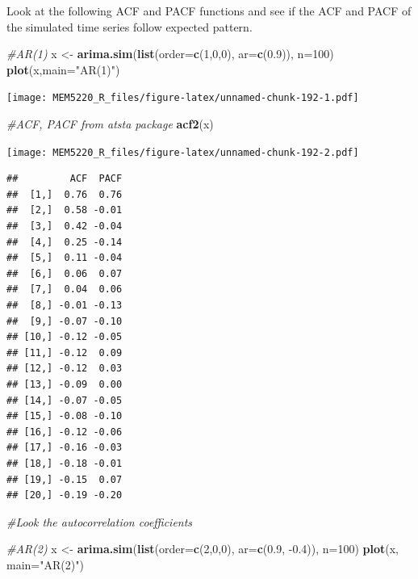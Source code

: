 \documentclass[]{book}
\newenvironment{Shaded}{\begin{snugshade}}{\end{snugshade}}
\newcommand{\CommentTok}[1]{\textcolor[rgb]{0.56,0.35,0.01}{\textit{#1}}}
\newcommand{\DataTypeTok}[1]{\textcolor[rgb]{0.13,0.29,0.53}{#1}}
\newcommand{\DecValTok}[1]{\textcolor[rgb]{0.00,0.00,0.81}{#1}}
\newcommand{\FloatTok}[1]{\textcolor[rgb]{0.00,0.00,0.81}{#1}}
\newcommand{\KeywordTok}[1]{\textcolor[rgb]{0.13,0.29,0.53}{\textbf{#1}}}
\newcommand{\NormalTok}[1]{#1}
\newcommand{\StringTok}[1]{\textcolor[rgb]{0.31,0.60,0.02}{#1}}
\begin{document}
Look at the following ACF and PACF functions and see if the ACF and PACF of the simulated time series follow expected pattern.

\begin{Shaded}
\begin{Highlighting}[]
\CommentTok{#AR(1)}
\NormalTok{x <-}\StringTok{ }\KeywordTok{arima.sim}\NormalTok{(}\KeywordTok{list}\NormalTok{(}\DataTypeTok{order=}\KeywordTok{c}\NormalTok{(}\DecValTok{1}\NormalTok{,}\DecValTok{0}\NormalTok{,}\DecValTok{0}\NormalTok{), }\DataTypeTok{ar=}\KeywordTok{c}\NormalTok{(}\FloatTok{0.9}\NormalTok{)), }\DataTypeTok{n=}\DecValTok{100}\NormalTok{)}
\KeywordTok{plot}\NormalTok{(x,}\DataTypeTok{main=}\StringTok{"AR(1)"}\NormalTok{) }
\end{Highlighting}
\end{Shaded}

\texttt{[image: MEM5220\_R\_files/figure-latex/unnamed-chunk-192-1.pdf]}

\begin{Shaded}
\begin{Highlighting}[]
\CommentTok{#ACF, PACF from atsta package}
\KeywordTok{acf2}\NormalTok{(x)}
\end{Highlighting}
\end{Shaded}

\texttt{[image: MEM5220\_R\_files/figure-latex/unnamed-chunk-192-2.pdf]}

\begin{verbatim}
##         ACF  PACF
##  [1,]  0.76  0.76
##  [2,]  0.58 -0.01
##  [3,]  0.42 -0.04
##  [4,]  0.25 -0.14
##  [5,]  0.11 -0.04
##  [6,]  0.06  0.07
##  [7,]  0.04  0.06
##  [8,] -0.01 -0.13
##  [9,] -0.07 -0.10
## [10,] -0.12 -0.05
## [11,] -0.12  0.09
## [12,] -0.12  0.03
## [13,] -0.09  0.00
## [14,] -0.07 -0.05
## [15,] -0.08 -0.10
## [16,] -0.12 -0.06
## [17,] -0.16 -0.03
## [18,] -0.18 -0.01
## [19,] -0.15  0.07
## [20,] -0.19 -0.20
\end{verbatim}

\begin{Shaded}
\begin{Highlighting}[]
\CommentTok{#Look the autocorrelation coefficients}

\CommentTok{#AR(2)}
\NormalTok{x <-}\StringTok{ }\KeywordTok{arima.sim}\NormalTok{(}\KeywordTok{list}\NormalTok{(}\DataTypeTok{order=}\KeywordTok{c}\NormalTok{(}\DecValTok{2}\NormalTok{,}\DecValTok{0}\NormalTok{,}\DecValTok{0}\NormalTok{), }\DataTypeTok{ar=}\KeywordTok{c}\NormalTok{(}\FloatTok{0.9}\NormalTok{, }\FloatTok{-0.4}\NormalTok{)), }\DataTypeTok{n=}\DecValTok{100}\NormalTok{)}
\KeywordTok{plot}\NormalTok{(x, }\DataTypeTok{main=}\StringTok{"AR(2)"}\NormalTok{) }
\end{Highlighting}
\end{Shaded}
\end{document}
